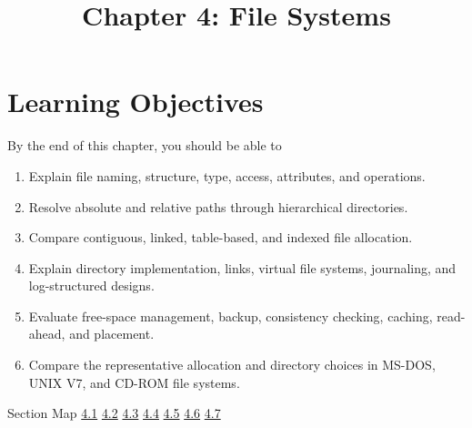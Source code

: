 \documentclass[10pt,letterpaper]{article}
\title{Chapter 4: File Systems}
\author{}
\date{}
\begin{document}
\maketitle
\section*{Learning Objectives}
\begin{studybox}{By the end of this chapter, you should be able to}
\begin{enumerate}
  \item Explain file naming, structure, type, access, attributes, and operations.
  \item Resolve absolute and relative paths through hierarchical directories.
  \item Compare contiguous, linked, table-based, and indexed file allocation.
  \item Explain directory implementation, links, virtual file systems, journaling, and log-structured designs.
  \item Evaluate free-space management, backup, consistency checking, caching, read-ahead, and placement.
  \item Compare the representative allocation and directory choices in MS-DOS, UNIX V7, and CD-ROM file systems.
\end{enumerate}
\end{studybox}

\begin{studybox}{Section Map}
\hyperlink{sec-4-1}{4.1} \quad \hyperlink{sec-4-2}{4.2} \quad \hyperlink{sec-4-3}{4.3} \quad \hyperlink{sec-4-4}{4.4} \quad \hyperlink{sec-4-5}{4.5} \quad \hyperlink{sec-4-6}{4.6} \quad \hyperlink{sec-4-7}{4.7}
\end{studybox}
\end{document}

